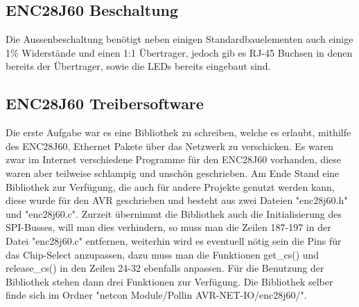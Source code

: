 \documentclass[a4paper,14pt,headsepline]{scrartcl}
\begin{document}
\subsection{ENC28J60 Beschaltung}
Die Aussenbeschaltung benötigt neben einigen Standardbauelementen auch einige 1\% Widerstände und einen 1:1 Übertrager, jedoch gib es RJ-45 Buchsen in denen bereits der Übertrager, sowie die LEDs bereits eingebaut sind.
\begin{figure}[h]
\begin{center}
\end{center}
\end{figure}

\subsection{ENC28J60 Treibersoftware}
Die erste Aufgabe war es eine Bibliothek zu schreiben, welche es erlaubt, mithilfe des ENC28J60, Ethernet Pakete über das Netzwerk zu verschicken. Es waren zwar im Internet verschiedene Programme für den ENC28J60 vorhanden, diese waren aber teilweise schlampig und unschön geschrieben. Am Ende Stand eine Bibliothek zur Verfügung, die auch für andere Projekte genutzt werden kann, diese wurde für den AVR geschrieben und besteht aus zwei Dateien "enc28j60.h" und "enc28j60.c". Zurzeit übernimmt die Bibliothek auch die Initialisierung des SPI-Busses, will man dies verhindern, so muss man die Zeilen 187-197 in der Datei "enc28j60.c" entfernen, weiterhin wird es eventuell nötig sein die  Pins für das Chip-Select anzupassen, dazu muss man die Funktionen get\_cs() und release\_cs() in den Zeilen 24-32 ebenfalls anpassen. Für die Benutzung der Bibliothek stehen dann drei Funktionen zur Verfügung. Die Bibliothek selber finde sich im Ordner "netcon Module/Pollin AVR-NET-IO/enc28j60/".
\end{document}

